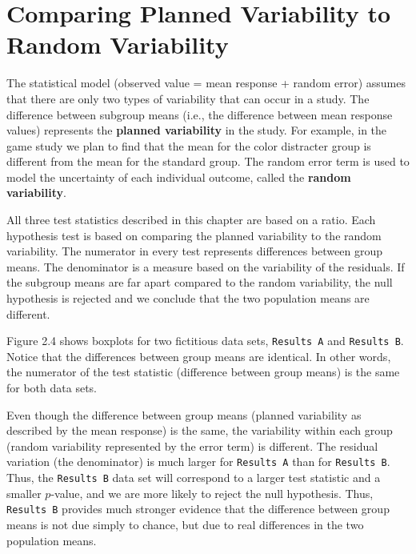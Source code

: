 \documentclass[
]{report}
\begin{document}
\section{\texorpdfstring{\textbf{Comparing Planned Variability to Random Variability}}{Comparing Planned Variability to Random Variability}}\label{comparing-planned-variability-to-random-variability}

The statistical model (observed value = mean response + random error) assumes that there are only two types of variability that can occur in a study. The difference between subgroup means (i.e., the difference between mean response values) represents the \textbf{planned variability} in the study. For example, in the game study we plan to find that the mean for the color distracter group is different from the mean for the standard group. The random error term is used to model the uncertainty of each individual outcome, called the \textbf{random variability}.

All three test statistics described in this chapter are based on a ratio. Each hypothesis test is based on comparing the planned variability to the random variability. The numerator in every test represents differences between group means. The denominator is a measure based on the variability of the residuals. If the subgroup means are far apart compared to the random variability, the null hypothesis is rejected and we conclude that the two population means are different.

Figure 2.4 shows boxplots for two fictitious data sets, \texttt{Results\ A} and \texttt{Results\ B}. Notice that the differences between group means are identical. In other words, the numerator of the test statistic (difference between group means) is the same for both data sets.

Even though the difference between group means (planned variability as described by the mean response) is the same, the variability within each group (random variability represented by the error term) is different. The residual variation (the denominator) is much larger for \texttt{Results\ A} than for \texttt{Results\ B}. Thus, the \texttt{Results\ B} data set will correspond to a larger test statistic and a smaller \(p\)-value, and we are more likely to reject the null hypothesis. Thus, \texttt{Results\ B} provides much stronger evidence that the difference between group means is not due simply to chance, but due to real differences in the two population means.

\large
\end{document}
